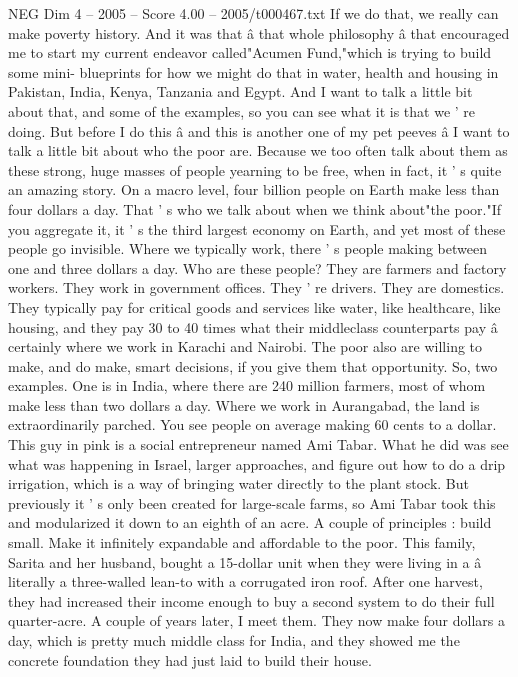 \begin{textsample}{NEG Dim 4 – 2005 – Score 4.00 – 2005/t000467.txt}
If we do that, we really can make poverty history.
And it was that â that whole philosophy â that encouraged me to start my current endeavor called"Acumen Fund,"which is trying to build some mini- blueprints for how we might do that in water, health and housing in Pakistan, India, Kenya, Tanzania and Egypt.
And I want to talk a little bit about that, and some of the examples, so you can see what it is that we ' re doing.
But before I do this â and this is another one of my pet peeves â I want to talk a little bit about who the poor are.
Because we too often talk about them as these strong, huge masses of people yearning to be free, when in fact, it ' s quite an amazing story.
On a macro level, four billion people on Earth make less than four dollars a day.
That ' s who we talk about when we think about"the poor."If you aggregate it, it ' s the third largest economy on Earth, and yet most of these people go invisible.
Where we typically work, there ' s people making between one and three dollars a day.
Who are these people?
They are farmers and factory workers.
They work in government offices.
They ' re drivers.
They are domestics.
They typically pay for critical goods and services like water, like healthcare, like housing, and they pay 30 to 40 times what their middleclass counterparts pay â certainly where we work in Karachi and Nairobi.
The poor also are willing to make, and do make, smart decisions, if you give them that opportunity.
So, two examples.
One is in India, where there are 240 million farmers, most of whom make less than two dollars a day.
Where we work in Aurangabad, the land is extraordinarily parched.
You see people on average making 60 cents to a dollar.
This guy in pink is a social entrepreneur named Ami Tabar.
What he did was see what was happening in Israel, larger approaches, and figure out how to do a drip irrigation, which is a way of bringing water directly to the plant stock.
But previously it ' s only been created for large-scale farms, so Ami Tabar took this and modularized it down to an eighth of an acre.
A couple of principles : build small.
Make it infinitely expandable and affordable to the poor.
This family, Sarita and her husband, bought a 15-dollar unit when they were living in a â literally a three-walled lean-to with a corrugated iron roof.
After one harvest, they had increased their income enough to buy a second system to do their full quarter-acre.
A couple of years later, I meet them.
They now make four dollars a day, which is pretty much middle class for India, and they showed me the concrete foundation they had just laid to build their house.

\end{textsample}
